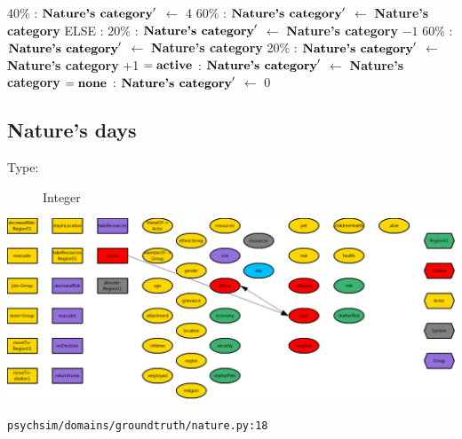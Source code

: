 \documentclass{article}%
\begin{document}
\begin{flushleft}
\hspace*{10em}%
40\%%
: %
$\mbox{\textbf{Nature's category}} '$%
$\leftarrow$%
4%
\linebreak%
\hspace*{10em}%
60\%%
: %
$\mbox{\textbf{Nature's category}} '$%
$\leftarrow$%
\textbf{Nature's category}%
\linebreak%
\hspace*{8em}%
ELSE %
: %
\linebreak%
\hspace*{10em}%
20\%%
: %
$\mbox{\textbf{Nature's category}} '$%
$\leftarrow$%
\textbf{Nature's category}%
${-}1$%
\linebreak%
\hspace*{10em}%
60\%%
: %
$\mbox{\textbf{Nature's category}} '$%
$\leftarrow$%
\textbf{Nature's category}%
\linebreak%
\hspace*{10em}%
20\%%
: %
$\mbox{\textbf{Nature's category}} '$%
$\leftarrow$%
\textbf{Nature's category}%
+1%
\linebreak%
\hspace*{2em}%
$= \mbox{\textbf{active}}$%
: %
$\mbox{\textbf{Nature's category}} '$%
$\leftarrow$%
\textbf{Nature's category}%
\linebreak%
\hspace*{2em}%
$= \mbox{\textbf{none}}$%
: %
$\mbox{\textbf{Nature's category}} '$%
$\leftarrow$%
0%
\end{flushleft}

%
\subsection{Nature's days}%
\label{subsec:Nature's days}%
\begin{description}%
\item[Type:]%
Integer%
\end{description}%
\includegraphics[width=\textwidth]{images/daysOfNature.png}%
\begin{flushleft}%
\verb|psychsim/domains/groundtruth/nature.py:18|%
\end{flushleft}%
\end{document}
